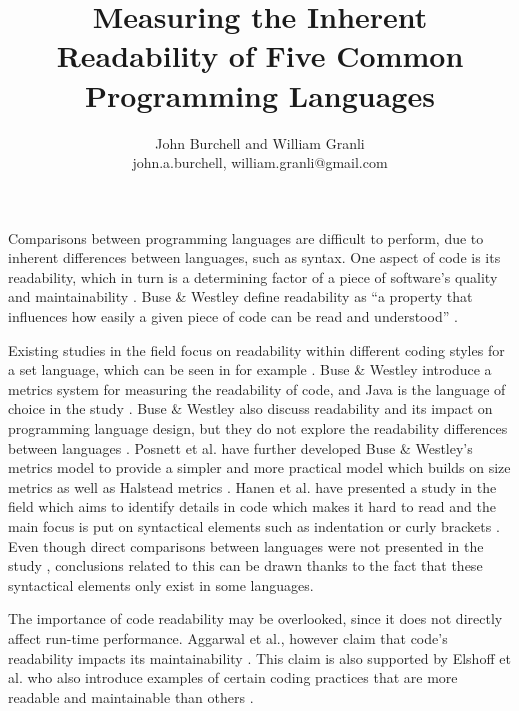\documentclass[times, 10pt,twocolumn]{Article}
\begin{document}
\title{Measuring the Inherent Readability of Five Common Programming Languages}

\author{John Burchell and William Granli \\
john.a.burchell, william.granli@gmail.com}




\maketitle
\thispagestyle{empty}


Comparisons between programming languages are difficult to perform, due to inherent differences between languages, such as syntax. One aspect of code is its readability, which in turn is a determining factor of a piece of software's quality and maintainability \cite{aggarwal2002integrated, elshoff1982improving}. Buse \& Westley define readability as ``a property that influences how easily a given piece of code can be read and understood'' \cite{buse2010learning}. 

Existing studies in the field focus on readability within different coding styles for a set language, which can be seen in for example \cite{buse2010learning}. Buse \& Westley introduce a metrics system for measuring the readability of code, and Java is the language of choice in the study \cite{buse2010learning}. Buse \& Westley also discuss readability and its impact on programming language design, but they do not explore the readability differences between languages \cite{buse2010learning}. Posnett et al. \cite{posnett2011simpler} have further developed Buse \& Westley's metrics model to provide a simpler and more practical model which builds on size metrics as well as Halstead metrics \cite{halstead1977elements}. Hanen et al. have presented a study in the field which aims to identify details in code which makes it hard to read and the main focus is put on syntactical elements such as indentation or curly brackets \cite{hansen2013makes}. Even though direct comparisons between languages were not presented in the study \cite{hansen2013makes}, conclusions related to this can be drawn thanks to the fact that these syntactical elements only exist in some languages. 

The importance of code readability may be overlooked, since it does not directly affect run-time performance. Aggarwal et al., however claim that code's readability impacts its maintainability \cite{aggarwal2002integrated}. This claim is also supported by \cite{elshoff1982improving} Elshoff et al. who also introduce examples of certain coding practices that are more readable and maintainable than others \cite{elshoff1982improving}.
\end{document}
